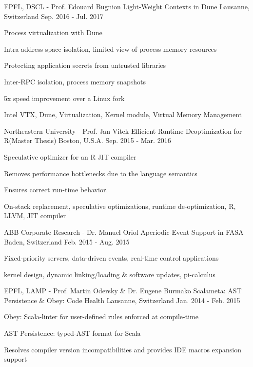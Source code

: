 \begin{cventries}
\cventry
{EPFL, DSCL - Prof. Edouard Bugnion}
{Light-Weight Contexts in Dune}
{Lausanne, Switzerland}
{Sep. 2016 - Jul. 2017}
{
	\begin{cvitems}
  \item{Process virtualization with Dune}
  \item{Intra-address space isolation, limited view of process memory resources}
  \item{Protecting application secrets from untrusted libraries}
  \item{Inter-RPC isolation, process memory snapshots}
  \item{5x speed improvement over a Linux fork}
	\item{Intel VTX, Dune, Virtualization, Kernel module, Virtual Memory Management}
	\end{cvitems}
}

\cventry
{Northeastern University - Prof. Jan Vitek} %
{Efficient Runtime Deoptimization for R(Master Thesis)} %
{Boston, U.S.A.} %
{Sep. 2015 - Mar. 2016} %
{ %
\begin{cvitems}
\item{Speculative optimizer for an R JIT compiler}
\item{Removes performance bottlenecks due to the language semantics}
\item{Ensures correct run-time behavior.}
\item {On-stack replacement, speculative optimizations, runtime de-optimization, R, LLVM, JIT compiler}
\end{cvitems}
}

\cventry
{ABB Corporate Research - Dr. Manuel Oriol}
{Aperiodic-Event Support in FASA}
{Baden, Switzerland}
{Feb. 2015 - Aug. 2015}
{
	\begin{cvitems}
  \item{Fixed-priority servers, data-driven events, real-time control applications}
  \item{kernel design, dynamic linking/loading \& software updates, pi-calculus}
	\end{cvitems}
}

\cventry
{EPFL, LAMP - Prof. Martin Odersky \& Dr. Eugene Burmako}
{Scalameta: AST Persistence \& Obey: Code Health}
{Lausanne, Switzerland}
{Jan. 2014 - Feb. 2015}
{
	\begin{cvitems}
	\item{Obey: Scala-linter for user-defined rules enforced at compile-time}
  \item{AST Persistence: typed-AST format for Scala}
  \item{Resolves compiler version incompatibilities and provides IDE macros expansion support}
	\end{cvitems}
}

\end{cventries}
